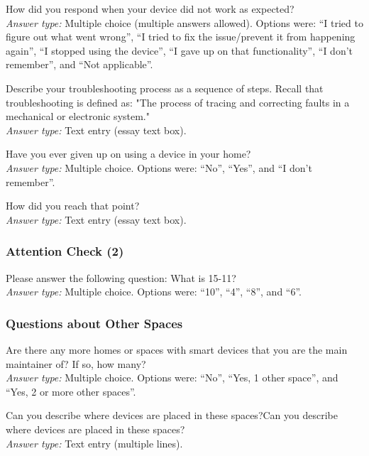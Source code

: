  How did you respond when your device did not work as expected? \\
\textit{Answer type:} Multiple choice (multiple answers allowed). Options were: ``I tried to figure out what went wrong'', ``I tried to fix the issue/prevent it from happening again'', ``I stopped using the device'', ``I gave up on that functionality'', ``I don't remember'', and ``Not applicable''.

 Describe your troubleshooting process as a sequence of steps.
Recall that troubleshooting is defined as: "The process of tracing and correcting faults in a mechanical or electronic system." \\
\textit{Answer type:} Text entry (essay text box).

 Have you ever given up on using a device in your home? \\
\textit{Answer type:} Multiple choice. Options were: ``No'', ``Yes'', and ``I don't remember''.

 How did you reach that point? \\
\textit{Answer type:} Text entry (essay text box).

\subsubsection{Attention Check (2)}

\printQcounter{} Please answer the following question: What is 15-11? \\
\textit{Answer type:} Multiple choice. Options were: ``10'', ``4'', ``8'', and ``6''.

\subsubsection{Questions about Other Spaces}
\label{appdx:survey:spaces}

 Are there any more homes or spaces with smart devices that you are the main maintainer of? If so, how many? \\
\textit{Answer type:} Multiple choice. Options were: ``No'', ``Yes, 1 other space'', and ``Yes, 2 or more other spaces''.

 Can you describe where devices are placed in these spaces?Can you describe where devices are placed in these spaces? \\
\textit{Answer type:} Text entry (multiple lines).

